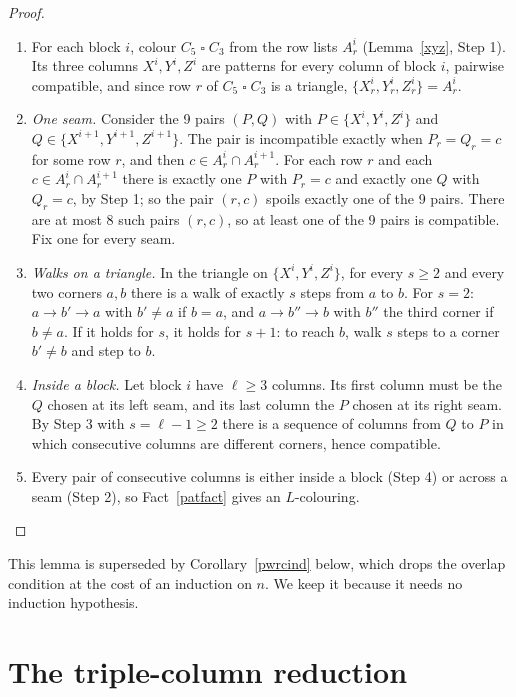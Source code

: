 \documentclass[11pt]{article}
\theoremstyle{plain}
\theoremstyle{definition}
\theoremstyle{remark}
\newcommand{\T}{\mathbin{\square}}
\newenvironment{steps}[1][]{\begin{enumerate}[label=\textbf{Step \arabic*.},leftmargin=4.4em,itemsep=0.35em,#1]}{\end{enumerate}}
\begin{document}
\begin{proof}
\begin{steps}
\item For each block $i$, colour $C_5 \T C_3$ from the row lists $A^i_r$ (Lemma~\ref{xyz}, Step 1). Its three columns
$X^i, Y^i, Z^i$ are patterns for every column of block $i$, pairwise compatible, and since row $r$ of $C_5 \T C_3$ is a
triangle, $\{X^i_r, Y^i_r, Z^i_r\} = A^i_r$.
\item \emph{One seam.} Consider the 9 pairs $(P, Q)$ with $P \in \{X^i, Y^i, Z^i\}$ and $Q \in \{X^{i+1}, Y^{i+1}, Z^{i+1}\}$.
The pair is incompatible exactly when $P_r = Q_r = c$ for some row $r$, and then $c \in A^i_r \cap A^{i+1}_r$. For each
row $r$ and each $c \in A^i_r \cap A^{i+1}_r$ there is exactly one $P$ with $P_r = c$ and exactly one $Q$ with $Q_r = c$,
by Step 1; so the pair $(r, c)$ spoils exactly one of the 9 pairs. There are at most 8 such pairs $(r, c)$, so at least one
of the 9 pairs is compatible. Fix one for every seam.
\item \emph{Walks on a triangle.} In the triangle on $\{X^i, Y^i, Z^i\}$, for every $s \ge 2$ and every two corners
$a, b$ there is a walk of exactly $s$ steps from $a$ to $b$. For $s = 2$: $a \to b' \to a$ with $b' \ne a$ if $b = a$, and
$a \to b'' \to b$ with $b''$ the third corner if $b \ne a$. If it holds for $s$, it holds for $s + 1$: to reach $b$, walk
$s$ steps to a corner $b' \ne b$ and step to $b$.
\item \emph{Inside a block.} Let block $i$ have $\ell \ge 3$ columns. Its first column must be the $Q$ chosen at its left
seam, and its last column the $P$ chosen at its right seam. By Step 3 with $s = \ell - 1 \ge 2$ there is a sequence of
columns from $Q$ to $P$ in which consecutive columns are different corners, hence compatible.
\item Every pair of consecutive columns is either inside a block (Step 4) or across a seam (Step 2), so Fact~\ref{patfact}
gives an $L$-colouring. \qedhere
\end{steps}
\end{proof}

This lemma is superseded by Corollary~\ref{pwrcind} below, which drops the overlap condition at the cost of an
induction on $n$. We keep it because it needs no induction hypothesis.

\section{The triple-column reduction}\label{sec:triple}
\end{document}
